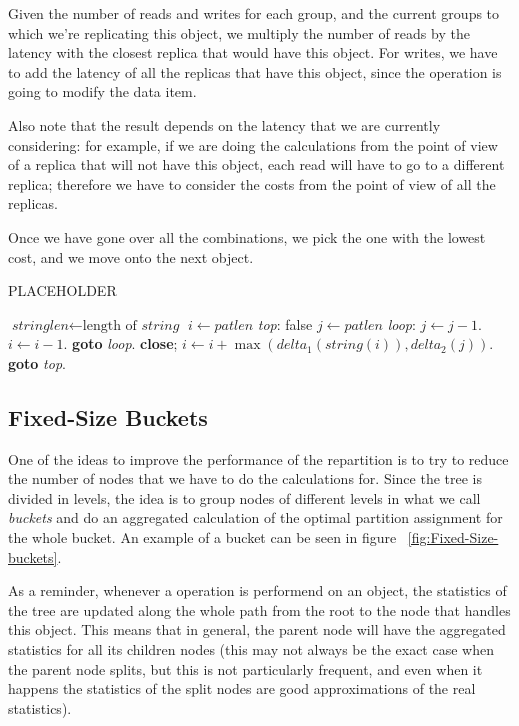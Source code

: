 Given the number of reads and writes for each group, and the current groups to which we're replicating this object, we multiply the number of reads by the latency with the closest replica that would have this object. For writes, we have to add the latency of all the replicas that have this object, since the operation is going to modify the data item.

Also note that the result depends on the latency that we are currently considering: for example, if we are doing the calculations from the point of view of a replica that will not have this object, each read will have to go to a different replica; therefore we have to consider the costs from the point of view of all the replicas.

Once we have gone over all the combinations, we pick the one with the lowest cost, and we move onto the next object.

\begin{algorithm}
  \caption{PLACEHOLDER}\label{alg:all-combinations}
  \begin{algorithmic}[1]
  \State $\textit{stringlen} \gets \text{length of }\textit{string}$
  \State $i \gets \textit{patlen}$
  \State \emph{top}:
   \Return false
  \EndIf
  \State $j \gets \textit{patlen}$
  \State \emph{loop}:
  \State $j \gets j-1$.
  \State $i \gets i-1$.
  \State \textbf{goto} \emph{loop}.
  \State \textbf{close};
  \EndIf
  \State $i \gets i+\max(\textit{delta}_1(\textit{string}(i)),\textit{delta}_2(j))$.
  \State \textbf{goto} \emph{top}.
  \EndProcedure
  \end{algorithmic}
  \end{algorithm}

\subsection{Fixed-Size Buckets}\label{sec:Fixed-Size buckets}
One of the ideas to improve the performance of the repartition is to try to reduce the number of nodes that we have to do the calculations for. Since the tree is divided in levels, the idea is to group nodes of different levels in what we call \emph{buckets} and do an aggregated calculation of the optimal partition assignment for the whole bucket. An example of a bucket can be seen in figure ~\ref{fig:Fixed-Size-buckets}.

As a reminder, whenever a operation is performend on an object, the statistics of the tree are updated along the whole path from the root to the node that handles this object. This means that in general, the parent node will have the aggregated statistics for all its children nodes (this may not always be the exact case when the parent node splits, but this is not particularly frequent, and even when it happens the statistics of the split nodes are good approximations of the real statistics).

